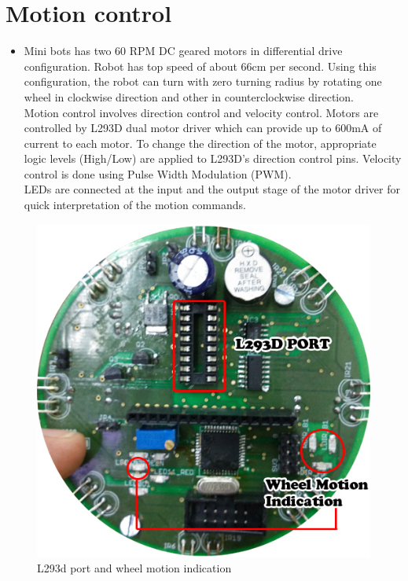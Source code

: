 \documentclass[a4paper,12pt,oneside]{book}
\begin{document}
	\chapter{Motion control}
	\begin{itemize}
	\item {Mini bots has two 60 RPM DC geared motors in differential drive configuration. Robot has top speed of about 66cm per second. Using this
		configuration, the robot can turn with zero turning radius by rotating one wheel in clockwise
		direction and other in counterclockwise direction.\\
		Motion control involves direction control and velocity control. Motors are controlled by L293D
		dual motor driver which can provide up to 600mA of current to each motor. To change the
		direction of the motor, appropriate logic levels (High/Low) are applied to L293D’s direction
		control pins. Velocity control is done using Pulse Width Modulation (PWM).\\
		LEDs are connected at the input and the output stage of the motor driver for quick interpretation
		of the motion commands.}
	\end{itemize}
	\begin{figure}[h!]
		\includegraphics[width=\textwidth]{./HardwareManual/WheelMotionIndication_L293D.jpg}
		\caption{L293d port and wheel motion indication}
	\end{figure}
\end{document}
